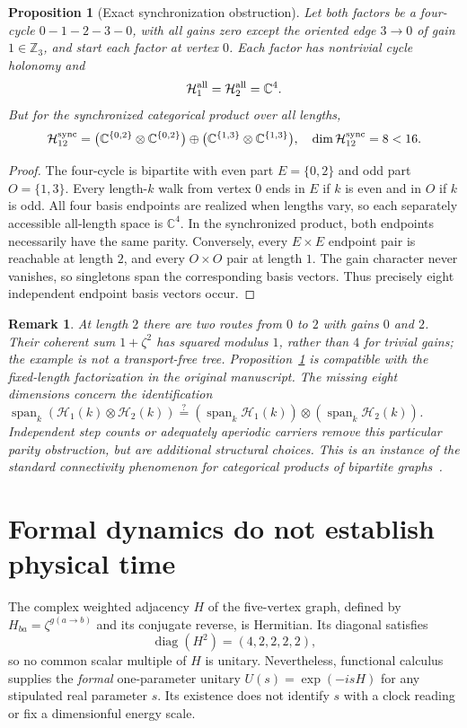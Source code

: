 \documentclass[11pt]{article}
\newtheorem{proposition}[theorem]{Proposition}
\newtheorem{remark}[theorem]{Remark}
\newcommand{\Z}{\mathbb Z}
\newcommand{\C}{\mathbb C}
\newcommand{\Hil}{\mathcal H}
\begin{document}
\begin{proposition}[Exact synchronization obstruction]\label{prop:sync}
Let both factors be a four-cycle $0-1-2-3-0$, with all gains zero except the oriented edge $3\to0$ of gain $1\in\Z_3$, and start each factor at vertex $0$. Each factor has nontrivial cycle holonomy and
\[
 \Hil_1^{\rm all}=\Hil_2^{\rm all}=\C^4.
\]
But for the synchronized categorical product over all lengths,
\begin{equation}
 \Hil_{12}^{\rm sync}=
 \big(\C^{\{0,2\}}\otimes\C^{\{0,2\}}\big)
 \oplus
 \big(\C^{\{1,3\}}\otimes\C^{\{1,3\}}\big),
 \quad \dim\Hil_{12}^{\rm sync}=8<16.
 \label{eq:sync}
\end{equation}
\end{proposition}
\begin{proof}
The four-cycle is bipartite with even part $E=\{0,2\}$ and odd part $O=\{1,3\}$. Every length-$k$ walk from vertex $0$ ends in $E$ if $k$ is even and in $O$ if $k$ is odd. All four basis endpoints are realized when lengths vary, so each separately accessible all-length space is $\C^4$. In the synchronized product, both endpoints necessarily have the same parity. Conversely, every $E\times E$ endpoint pair is reachable at length $2$, and every $O\times O$ pair at length $1$. The gain character never vanishes, so singletons span the corresponding basis vectors. Thus precisely eight independent endpoint basis vectors occur.\qedhere
\end{proof}

\begin{remark}
At length $2$ there are two routes from $0$ to $2$ with gains $0$ and $2$. Their coherent sum $1+\zeta^2$ has squared modulus $1$, rather than $4$ for trivial gains; the example is not a transport-free tree. Proposition~\ref{prop:sync} is compatible with the fixed-length factorization in the original manuscript. The missing eight dimensions concern the identification $\operatorname{span}_k(\Hil_1(k)\otimes\Hil_2(k))\stackrel?= (\operatorname{span}_k\Hil_1(k))\otimes(\operatorname{span}_k\Hil_2(k))$. Independent step counts or adequately aperiodic carriers remove this particular parity obstruction, but are additional structural choices. This is an instance of the standard connectivity phenomenon for categorical products of bipartite graphs~\cite{Weichsel}.
\end{remark}

\section{Formal dynamics do not establish physical time}
The complex weighted adjacency $H$ of the five-vertex graph, defined by $H_{ba}=\zeta^{g(a\to b)}$ and its conjugate reverse, is Hermitian. Its diagonal satisfies
\begin{equation}
 \operatorname{diag}(H^2)=(4,2,2,2,2), \label{eq:notunitary}
\end{equation}
so no common scalar multiple of $H$ is unitary. Nevertheless, functional calculus supplies the \emph{formal} one-parameter unitary $U(s)=\exp(-isH)$ for any stipulated real parameter $s$. Its existence does not identify $s$ with a clock reading or fix a dimensionful energy scale.
\end{document}
